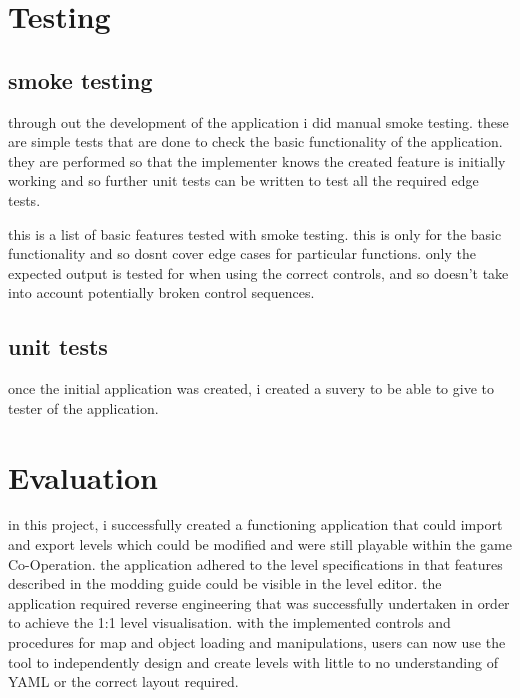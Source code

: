 
\section{Testing}
\subsection{smoke testing}
through out the development of the application i did manual smoke testing. these are simple tests that are done to check the basic functionality of the application. they are performed so that the implementer knows the created feature is initially working and so further unit tests can be written to test all the required edge tests.

this is a list of basic features tested with smoke testing. this is only for the basic functionality and so dosnt cover edge cases for particular functions. only the expected output is tested for when using the correct controls, and so doesn't take into account potentially broken control sequences.


\subsection{unit tests}

once the initial application was created, i created a suvery to be able to give to tester of the application.



\section{Evaluation}

in this project, i successfully created a functioning application that could import and export levels which could be modified and were still playable within the game Co-Operation. the application adhered to the level specifications in that features described in the modding guide could be visible in the level editor. the application required reverse engineering that was successfully undertaken in order to achieve the 1:1 level visualisation. with the implemented controls and procedures for map and object loading and manipulations, users can now use the tool to independently design and create levels with little to no understanding of YAML or the correct layout required. 

